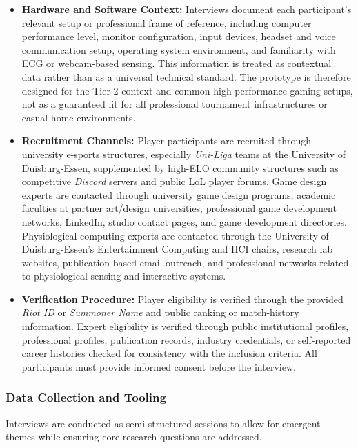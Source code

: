 \begin{itemize}
    \item \textbf{Hardware and Software Context:} Interviews document each participant's relevant setup or professional frame of reference, including computer performance level, monitor configuration, input devices, headset and voice communication setup, operating system environment, and familiarity with ECG or webcam-based sensing. This information is treated as contextual data rather than as a universal technical standard. The prototype is therefore designed for the Tier 2 context and common high-performance gaming setups, not as a guaranteed fit for all professional tournament infrastructures or casual home environments.

    \item \textbf{Recruitment Channels:} Player participants are recruited through university e-sports structures, especially \textit{Uni-Liga} teams at the University of Duisburg-Essen, supplemented by high-ELO community structures such as competitive \textit{Discord} servers and public LoL player forums. Game design experts are contacted through university game design programs, academic faculties at partner art/design universities, professional game development networks, LinkedIn, studio contact pages, and game development directories. Physiological computing experts are contacted through the University of Duisburg-Essen's Entertainment Computing and HCI chairs, research lab websites, publication-based email outreach, and professional networks related to physiological sensing and interactive systems.

    \item \textbf{Verification Procedure:} Player eligibility is verified through the provided \textit{Riot ID} or \textit{Summoner Name} and public ranking or match-history information. Expert eligibility is verified through public institutional profiles, professional profiles, publication records, industry credentials, or self-reported career histories checked for consistency with the inclusion criteria. All participants must provide informed consent before the interview.
\end{itemize}



\subsubsection{Data Collection and Tooling}
Interviews are conducted as semi-structured sessions to allow for emergent themes while ensuring core research questions are addressed. 

